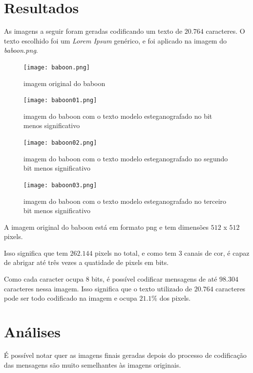 \documentclass[conference]{IEEEtran}
\begin{document}
\section{Resultados}

    As imagens a seguir foram geradas codificando um texto de $20.764$ caracteres. O texto escolhido foi um \textit{Lorem Ipsum} genérico, e foi aplicado na imagem do \textit{baboon.png}.

    \begin{figure}[ht]
        \centering
        \texttt{[image: baboon.png]}
        \caption{imagem original do baboon}
        \label{baboon-org}
    \end{figure}

    \begin{figure}[ht]
        \centering
        \texttt{[image: baboon01.png]}
        \caption{imagem do baboon com o texto modelo esteganografado no bit menos significativo}
        \label{baboon1}
    \end{figure}

    \begin{figure}[ht]
        \centering
        \texttt{[image: baboon02.png]}
        \caption{imagem do baboon com o texto modelo esteganografado no segundo bit menos significativo}
        \label{baboon2}
    \end{figure}

    \begin{figure}[ht]
        \centering
        \texttt{[image: baboon03.png]}
        \caption{imagem do baboon com o texto modelo esteganografado no terceiro bit menos significativo}
        \label{baboon3}
    \end{figure}

    A imagem original do baboon está em formato png e tem dimensões $512$ x $512$ pixels.

    Isso significa que tem $262.144$ pixels no total, e como tem 3 canais de cor, é capaz de abrigar até três vezes a quatidade de pixels em bits.

    Como cada caracter ocupa 8 bits, é possível codificar mensagens de até $98.304$ caracteres nessa imagem.
    Isso significa que o texto utilizado de $20.764$ caracteres pode ser todo codificado na imagem e ocupa $21.1\%$ dos pixels.

\section{Análises}

    É possível notar quer as imagens finais geradas depois do processo de codificação das mensagens são muito semelhantes às imagens originais.
\end{document}
